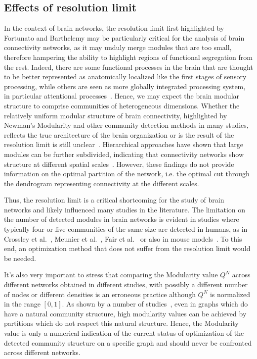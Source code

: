 \subsection{Effects of resolution limit}
In the context of brain networks, the resolution limit first highlighted by Fortunato and Barthelemy may be particularly critical for the analysis of brain connectivity networks, as it may unduly merge modules that are too small, therefore hampering the ability to highlight regions of functional segregation from the rest. Indeed, there are some functional processes in the brain that are thought to be better represented as anatomically localized like the first stages of sensory processing, while others are seen as more globally integrated processing system, in particular attentional processes~\cite{alnaes2015}.
Hence, we may expect the brain modular structure to comprise communities of heterogeneous dimensions.
Whether the relatively uniform modular structure of brain connectivity, highlighted by Newman's Modularity and other community detection methods in many studies, reflects the true architecture of the brain organization or is the result of the resolution limit is still unclear~\cite{nicolini2016}.
Hierarchical approaches have shown that large modules can be further subdivided, indicating that connectivity networks show structure at different spatial scales~\cite{meunier2009}.
However, these findings do not provide information on the optimal partition of the network, i.e. the optimal cut through the dendrogram representing connectivity at the different scales.

Thus, the resolution limit is a critical shortcoming for the study of brain networks and likely influenced many studies in the literature.
The limitation on the number of detected modules in brain networks is evident in studies where typically four or five communities of the same size are detected in humans, as in Crossley et al.~\cite{crossley2013a}, Meunier et al.~\cite{meunier2009a,meunier2010}, Fair et al.~\cite{fair2009} or also in mouse models~\cite{schwarz2008}.
To this end, an optimization method that does not suffer from the resolution limit would be needed.

It's also very important to stress that comparing the Modularity value $Q^N$ across different networks obtained in different studies, with possibly a different number of nodes or different densities is an erroneous practice although $Q^N$ is normalized in the range $[0,1]$. As shown by a number of studies~\cite{good2009,kehagias2013,radicchi2010}, even in graphs which do have a natural community structure, high modularity values can be achieved by partitions which do not respect this natural structure. Hence, the Modularity value is only a numerical indication of the current status of optimization of the detected community structure on a specific graph and should never be confronted across different networks.


